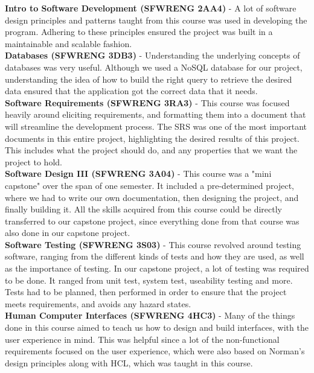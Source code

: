 \documentclass{article}
\begin{document}
\textbf{Intro to Software Development (SFWRENG 2AA4)} - A lot of software design
principles and patterns taught from this course was used in developing the
program. Adhering to these principles ensured the project was built in a
maintainable and scalable fashion. \\

\textbf{Databases (SFWRENG 3DB3)} - Understanding the underlying concepts of databases
was very useful. Although we used a NoSQL database for our project,
understanding the idea of how to build the right query to retrieve the desired
data ensured that the application got the correct data that it needs. \\

\textbf{Software Requirements (SFWRENG 3RA3)} - This course was focused heavily around
eliciting requirements, and formatting them into a document that will streamline
the development process. The SRS was one of the most important documents in this
entire project, highlighting the desired results of this project. This includes
what the project should do, and any properties that we want the project to hold. \\

\textbf{Software Design III (SFWRENG 3A04)} - This course was a "mini capstone" over the
span of one semester. It included a pre-determined project, where we had to
write our own documentation, then designing the project, and finally building
it. All the skills acquired from this course could be directly transferred to
our capstone project, since everything done from that course was also done in
our capstone project. \\

\textbf{Software Testing (SFWRENG 3S03)} - This course revolved around testing software,
ranging from the different kinds of tests and how they are used, as well as the
importance of testing. In our capstone project, a lot of testing was required to
be done. It ranged from unit test, system test, useability testing and more.
Tests had to be planned, then performed in order to ensure that the project
meets requirements, and avoids any hazard states. \\

\textbf{Human Computer Interfaces (SFWRENG 4HC3)} - Many of the things done in this
course aimed to teach us how to design and build interfaces, with the user
experience in mind. This was helpful since a lot of the non-functional
requirements focused on the user experience, which were also based on Norman's
design principles along with HCL, which was taught in this course.
\end{document}
